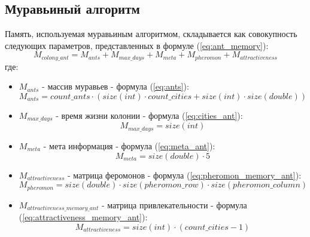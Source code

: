 \subsection{Муравьиный алгоритм}
	Память, используемая муравьиным алгоритмом, складывается как совокупность следующих параметров, представленных в формуле (\ref{eq:ant_memory}):
	\begin{equation}
		\label{eq:ant_memory}
		M_{colony\_ant} = M_{ants} + M_{max\_days} + M_{meta} + M_{pheromon} + M_{attractiveness}
	\end{equation}
	где:
	\begin{itemize}
		\item $M_{ants}$ - массив муравьев - формула (\ref{eq:ants}):
		\begin{equation}
			\label{eq:ants}
			M_{ants} = count\_ants \cdot (size(int) \cdot count\_cities + size(int) \cdot size(double))
		\end{equation}
	
		\item $M_{max\_days}$ - время жизни колонии - формула (\ref{eq:cities_ant}):
		\begin{equation}
			\label{eq:cities_ant}
			M_{max\_days} = size(int)
		\end{equation}
	
		\item $M_{meta}$ - мета информация - формула (\ref{eq:meta_ant}):
		\begin{equation}
			\label{eq:meta_ant}
			M_{meta} = size(double) \cdot 5
		\end{equation}
	
		\item $M_{attractiveness}$ - матрица феромонов - формула  (\ref{eq:pheromon_memory_ant}):
		\begin{equation}
			\label{eq:pheromon_memory_ant}
			M_{pheromon} = size(double) \cdot size(pheromon\_row) \cdot size(pheromon\_column)
		\end{equation}
	
		\item $M_{attractiveness\_memory\_ant}$ - матрица привлекательности - формула (\ref{eq:attractiveness_memory_ant}):
		\begin{equation}
			\label{eq:attractiveness_memory_ant}
			M_{attractiveness} = size(int) \cdot (count\_cities - 1)
		\end{equation}
	\end{itemize}

